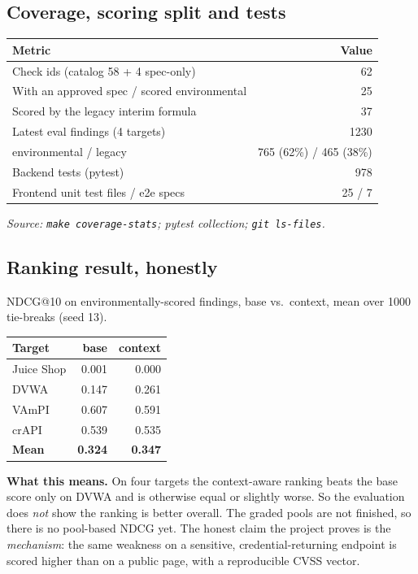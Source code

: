 \subsection{Coverage, scoring split and tests}
\begin{center}\small
\begin{tabular}{@{}lr@{}}
\toprule
Metric & Value\\
\midrule
Check ids (catalog 58 + 4 spec-only) & 62\\
With an approved spec / scored environmental & 25\\
Scored by the legacy interim formula & 37\\
Latest eval findings (4 targets) & 1230\\
\quad environmental / legacy & 765 (62\%) / 465 (38\%)\\
Backend tests (pytest) & 978\\
Frontend unit test files / e2e specs & 25 / 7\\
\bottomrule
\end{tabular}
\end{center}
\hfill\textit{\footnotesize Source: \texttt{make coverage-stats}; pytest collection; \texttt{git ls-files}.}

\subsection{Ranking result, honestly}
NDCG@10 on environmentally-scored findings, base vs.\ context, mean over 1000
tie-breaks (seed 13).
\begin{center}\small
\begin{tabular}{@{}lrr@{}}
\toprule
Target & base & context\\
\midrule
Juice Shop & 0.001 & 0.000\\
DVWA & 0.147 & 0.261\\
VAmPI & 0.607 & 0.591\\
crAPI & 0.539 & 0.535\\
\textbf{Mean} & \textbf{0.324} & \textbf{0.347}\\
\bottomrule
\end{tabular}
\end{center}
\textbf{What this means.} On four targets the context-aware ranking beats the
base score only on DVWA and is otherwise equal or slightly worse. So the
evaluation does \emph{not} show the ranking is better overall. The graded pools
are not finished, so there is no pool-based NDCG yet. The honest claim the
project proves is the \emph{mechanism}: the same weakness on a sensitive,
credential-returning endpoint is scored higher than on a public page, with a
reproducible CVSS vector.

